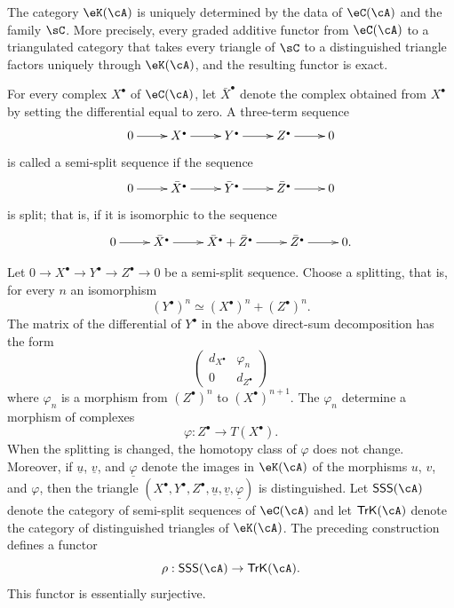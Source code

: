 \subsubsection{}\label{VIII:1-2-4}

The category $\eK(\cA)$ is uniquely determined by the data of $\eC(\cA)$
and the family $\sC$. More precisely, every graded additive functor from
$\eC(\cA)$ to a triangulated category that takes every triangle of $\sC$
to a distinguished triangle factors uniquely through $\eK(\cA)$, and the
resulting functor is exact.

For every complex $X^\bullet$ of $\eC(\cA)$, let $\bar X^\bullet$ denote
the complex obtained from $X^\bullet$ by setting the differential equal
to zero. A three-term sequence
\[\xymatrix{
  0 \ar[r]
    & X^\bullet \ar[r]
    & Y^\bullet \ar[r]
    & Z^\bullet \ar[r]
    & 0
}\]
is called a semi-split sequence if the sequence
\[\xymatrix{
  0 \ar[r]
    & \bar X^\bullet \ar[r]
    & \bar Y^\bullet \ar[r]
    & \bar Z^\bullet \ar[r]
    & 0
}\]
is split; that is, if it is isomorphic to the sequence
\[\xymatrix{
  0 \ar[r]
    & \bar X^\bullet \ar[r]
    & \bar X^\bullet + \bar Z^\bullet \ar[r]
    & \bar Z^\bullet \ar[r]
    & 0 \text{.}
}\]

Let $0 \to X^\bullet \to Y^\bullet \to Z^\bullet \to 0$ be a semi-split
sequence. Choose a splitting, that is, for every $n$ an isomorphism
\[
  (Y^\bullet)^n \simeq (X^\bullet)^n + (Z^\bullet)^n \text{.}
\]
The matrix of the differential of $Y^\bullet$ in the above direct-sum
decomposition has the form
\[
  \begin{pmatrix}
    d_{X^\bullet} & \varphi_n \\
    0 & d_{Z^\bullet}
  \end{pmatrix}
\]
where $\varphi_n$ is a morphism from $(Z^\bullet)^n$ to
$(X^\bullet)^{n+1}$. The $\varphi_n$ determine a morphism of complexes
\[
  \varphi:Z^\bullet \to T(X^\bullet) \text{.}
\]
When the splitting is changed, the homotopy class of $\varphi$ does not
change. Moreover, if $\underline u$, $\underline v$, and
$\underline\varphi$ denote the images in $\eK(\cA)$ of the morphisms $u$,
$v$, and $\varphi$, then the triangle
$(X^\bullet,Y^\bullet,Z^\bullet,\underline u,\underline v,\underline\varphi)$
is distinguished. Let $\mathsf{SSS}(\cA)$ denote the category of
semi-split sequences of $\eC(\cA)$ and let $\mathsf{TrK}(\cA)$ denote the
category of distinguished triangles of $\eK(\cA)$. The preceding
construction defines a functor
\[
  \rho:\mathsf{SSS}(\cA) \to \mathsf{TrK}(\cA) \text{.}
\]
This functor is essentially surjective.

